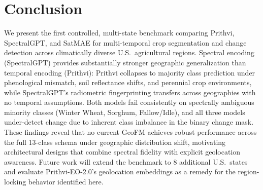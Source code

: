 \documentclass[sigconf, nonacm]{acmart}
\begin{document}
\section{Conclusion}

We present the first controlled, multi-state benchmark
comparing Prithvi, SpectralGPT, and SatMAE for multi-temporal
crop segmentation and change detection across climatically
diverse U.S.\ agricultural regions. Spectral encoding
(SpectralGPT) provides substantially stronger geographic
generalization than temporal encoding (Prithvi): Prithvi
collapses to majority class prediction under phenological
mismatch, soil reflectance shifts, and perennial crop
environments, while SpectralGPT's radiometric fingerprinting
transfers across geographies with no temporal assumptions.
Both models fail consistently on spectrally ambiguous minority
classes (Winter Wheat, Sorghum, Fallow/Idle), and all three
models under-detect change due to inherent class imbalance
in the binary change mask. These findings reveal that no
current GeoFM achieves robust performance across the full
13-class schema under geographic distribution shift,
motivating architectural designs that combine spectral
fidelity with explicit geolocation awareness.
Future work will extend the benchmark to 8 additional
U.S.\ states and evaluate Prithvi-EO-2.0's geolocation
embeddings as a remedy for the region-locking behavior
identified here.



\end{document}
